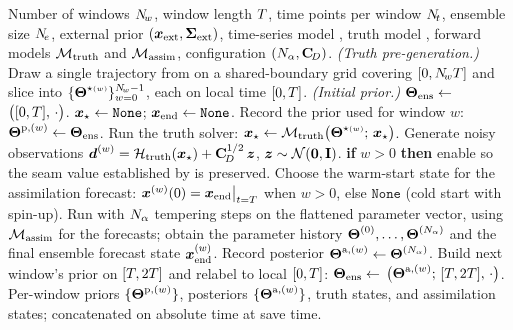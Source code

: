 \begin{algorithm}[t]
\caption{Rolling-window \ESMDA{} with time-varying parameters.}
\label{alg:rollout}
\begin{algorithmic}[1]
\REQUIRE Number of windows $N_{\!w}$, window length $T$, time
points per window $N_{\!t}$, ensemble size $N_{\!e}$, external prior
$(\boldsymbol{x}_{\mathrm{ext}}, \boldsymbol{\Sigma}_{\mathrm{ext}})$, time-series model , truth model
, forward models $\mathcal{M}_{\mathrm{truth}}$ and
$\mathcal{M}_{\mathrm{assim}}$, \ESMDA{} configuration $(N_{\alpha}, \mathbf{C}_{\!D})$.
\STATE \emph{(Truth pre-generation.)}\;
       Draw a single trajectory from  on a
       shared-boundary grid covering $[0, N_{\!w}T]$ and slice
       into $\{\boldsymbol{\Theta}^{\star{\scriptscriptstyle (w)}}\}_{w=0}^{N_{\!w}-1}$, each
       on local time $[0, T]$.
\STATE \emph{(Initial prior.)}\;
       $\boldsymbol{\Theta}_{\mathrm{ens}} \leftarrow$
       $\bigl([0, T],\,
       \cdot\bigr)$.
\STATE $\boldsymbol{x}_\star \leftarrow \mathtt{None}$;\quad
       $\boldsymbol{x}_{\mathrm{end}} \leftarrow \mathtt{None}$.
  \STATE Record the prior used for window $w$:
         $\boldsymbol{\Theta}^{\mathrm{p},(w)} \leftarrow \boldsymbol{\Theta}_{\mathrm{ens}}$.
  \STATE Run the truth solver:
         $\boldsymbol{x}_\star \leftarrow \mathcal{M}_{\mathrm{truth}}\bigl(
         \boldsymbol{\Theta}^{\star{\scriptscriptstyle (w)}};\, \boldsymbol{x}_\star\bigr)$.
  \STATE Generate noisy observations
         $\boldsymbol{d}^{(w)} = \mathcal{H}_{\mathrm{truth}}(\boldsymbol{x}_\star)
         + \mathbf{C}_{\!D}^{1/2}\,\boldsymbol{z}$,
         $\boldsymbol{z} \sim \mathcal{N}(\mathbf{0}, \mathbf{I})$.
  \STATE \textbf{if} $w > 0$ \textbf{then} enable
          so the seam value
         established by  is preserved.
  \STATE Choose the warm-start state for the assimilation forecast:
         $\boldsymbol{x}^{(w)}(0) =
         \boldsymbol{x}_{\mathrm{end}}\big|_{t=T}$ when $w > 0$,
         else $\mathtt{None}$ (cold start with spin-up).
  \STATE Run \ESMDA{} with $N_{\alpha}$ tempering steps on the
         flattened parameter vector, using
         $\mathcal{M}_{\mathrm{assim}}$ for the forecasts; obtain the
         parameter history $\boldsymbol{\Theta}^{(0)}, \ldots,
         \boldsymbol{\Theta}^{(N_{\alpha})}$ and the final ensemble forecast
         state $\boldsymbol{x}_{\mathrm{end}}^{(w)}$.
  \STATE Record posterior $\boldsymbol{\Theta}^{\mathrm{a},(w)} \leftarrow
         \boldsymbol{\Theta}^{(N_{\alpha})}$.
    \STATE Build next window's prior on $[T, 2T]$
           and relabel to local $[0, T]$:\;
           $\boldsymbol{\Theta}_{\mathrm{ens}} \leftarrow$
           $\bigl(
           \boldsymbol{\Theta}^{\mathrm{a},(w)};\,
           [T, 2T],\, \cdot\bigr)$.
  \ENDIF
\ENDFOR
\ENSURE Per-window priors $\{\boldsymbol{\Theta}^{\mathrm{p},(w)}\}$, posteriors
$\{\boldsymbol{\Theta}^{\mathrm{a},(w)}\}$, truth states, and assimilation states;
concatenated on absolute time at save time.
\end{algorithmic}
\end{algorithm}


